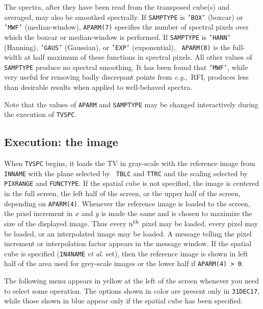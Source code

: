 \documentclass[twoside]{article}
\newcommand{\Hi}[1]{\textcolor{hicol}{#1}}
\newcommand{\Me}[1]{\textcolor{mecol}{#1}}
\newcommand{\eg}{{\it e.g.},}
\begin{document}
The spectra, after they have been read from the transposed cube(s) and
averaged, may also be smoothed spectrally.  If {\tt SAMPTYPE} is
{\tt 'BOX'} (boxcar) or {\tt 'MWF'} (median-window), {\tt APARM(7)}
specifies the number of spectral pixels over which the boxcar or
median-window is performed.  If {\tt SAMPTYPE} is {\tt 'HANN'}
(Hanning), {\tt 'GAUS'} (Gaussian), or {\tt 'EXP'} (exponential), {\tt
  APARM(8)} is the full-width at half maximum of these functions in
spectral pixels.  All other values of {\tt SAMPTYPE} produce no
spectral smoothing.  It has been found that {\tt 'MWF'}, while very
useful for removing badly discrepant points from \eg\ RFI, produces
less than desirable results when applied to well-behaved spectra.

Note that the values of {\tt APARM} and {\tt SAMPTYPE} may be changed
interactively during the execution of {\tt TVSPC}\@.

\subsection{Execution: the image}

When {\tt TVSPC} begins, it loads the TV in gray-scale with the
reference image from {\tt INNAME} with the plane selected by {\tt
  TBLC} and {\tt TTRC} and the scaling selected by {\tt PIXRANGE} and
{\tt FUNCTYPE}\@.  If the spatial cube is not specified, the image is
centered in the full screen, the left half of the screen, or the upper
half of the screen, depending on {\tt APARM(4)}\@.  Whenever the
reference image is loaded to the screen, the pixel increment in $x$
and $y$ is made the same and is chosen to maximize the size of the
displayed image.  Thus every $n^{\rm th}$ pixel may be loaded, every
pixel may be loaded, or an interpolated image may be loaded.  A
message telling the pixel increment or interpolation factor appears in
the message window.  If the spatial cube is specified ({\tt IN4NAME}
{\it et al.} set), then the reference image is shown in left half of
the area used for grey-scale images or the lower half if {\tt APARM(4)
  > 0}.

The following menu appears in yellow at the left of the screen
whenever you need to select some operation.  \Me{The options shown in
\Hi{color} are present only in {\tt 31DEC17}, while those shown in
\Hi{blue} appear only if the spatial cube has been specified.}
\end{document}
